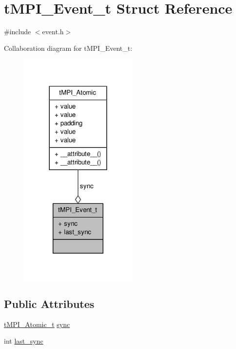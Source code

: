 \hypertarget{structtMPI__Event__t}{\section{t\-M\-P\-I\-\_\-\-Event\-\_\-t \-Struct \-Reference}
\label{structtMPI__Event__t}
}


{\ttfamily \#include $<$event.\-h$>$}



\-Collaboration diagram for t\-M\-P\-I\-\_\-\-Event\-\_\-t\-:
\nopagebreak
\begin{figure}[H]
\begin{center}
\leavevmode
\includegraphics[width=168pt]{structtMPI__Event__t__coll__graph}
\end{center}
\end{figure}
\subsection*{\-Public \-Attributes}
\begin{DoxyCompactItemize}
\item 
\hyperlink{include_2thread__mpi_2atomic_2gcc_8h_a2c33794dc540e3b07cffc1f81a3fe4b4}{t\-M\-P\-I\-\_\-\-Atomic\-\_\-t} \hyperlink{structtMPI__Event__t_abbe22cec807214ee89b7aee75af9a608}{sync}
\item 
int \hyperlink{structtMPI__Event__t_a580524ca5296c26f12c9057096f09455}{last\-\_\-sync}
\end{DoxyCompactItemize}


